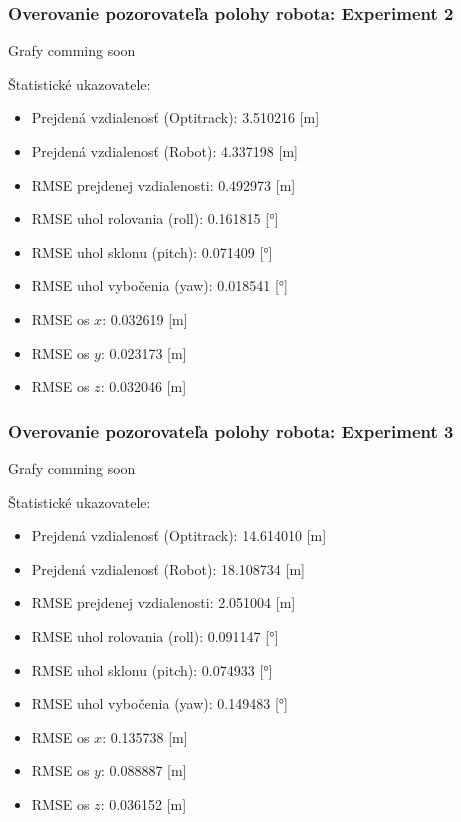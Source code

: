 \newpage\subsubsection{Overovanie pozorovateľa polohy robota: Experiment 2}
\begin{center}
    Grafy comming soon
\end{center}
Štatistické ukazovatele:
\begin{itemize}
    \item Prejdená vzdialenosť (Optitrack): 3.510216 [m]
    \item Prejdená vzdialenosť (Robot): 4.337198 [m]
    \item RMSE prejdenej vzdialenosti: 0.492973 [m]
    \item RMSE uhol rolovania (roll): 0.161815 [°]
    \item RMSE uhol sklonu (pitch): 0.071409 [°]
    \item RMSE uhol vybočenia (yaw): 0.018541 [°] 
    \item RMSE os $x$: 0.032619 [m]
    \item RMSE os $y$: 0.023173 [m]
    \item RMSE os $z$: 0.032046 [m]
\end{itemize}

\newpage\subsubsection{Overovanie pozorovateľa polohy robota: Experiment 3}
\begin{center}
    Grafy comming soon
\end{center}
Štatistické ukazovatele:
\begin{itemize}
    \item Prejdená vzdialenosť (Optitrack): 14.614010 [m]
    \item Prejdená vzdialenosť (Robot): 18.108734 [m]
    \item RMSE prejdenej vzdialenosti: 2.051004 [m]
    \item RMSE uhol rolovania (roll): 0.091147 [°]
    \item RMSE uhol sklonu (pitch): 0.074933 [°]
    \item RMSE uhol vybočenia (yaw): 0.149483 [°] 
    \item RMSE os $x$: 0.135738 [m]
    \item RMSE os $y$: 0.088887 [m]
    \item RMSE os $z$: 0.036152 [m]
\end{itemize}